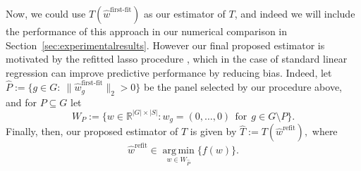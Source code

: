\documentclass[12pt]{article}
\DeclareMathOperator*{\argmin}{arg\,min}
\begin{document}
Now, we could use $T(\hat{w}^{\text{first-fit}})$ as our estimator of $T$, and indeed we will include the performance of this approach in our numerical comparison in Section~\ref{sec:experimentalresults}. However our final proposed estimator is motivated by the refitted \acrshort{lasso} procedure \citep[see][]{chzhen_lasso_2019}, which in the case of standard linear regression can improve predictive performance by reducing bias. 
Indeed, let $\hat{P} := \{g \in G: \ \|\hat{w}^{\text{first-fit}}_g\|_2 > 0 \}$ be the panel selected by our procedure above, and for $P\subseteq G$ let
\[
W_{P} := \{ w \in \mathbb{R}^{|G| \times |S|} : w_g = (0, \ldots, 0) \ \ \text{for} \ \ g \in G\setminus P \}.
\] 
Finally, then, our proposed estimator of $T$ is given by $\hat{T} := T(\hat{w}^{\text{refit}}),$ where  
\begin{equation} 
\label{eq:wrefit}
\hat{w}^{\text{refit}} \in  \argmin\limits_{w \in W_{\hat{P}}} \bigl\{f(w)\bigr\}.
\end{equation}
\end{document}
